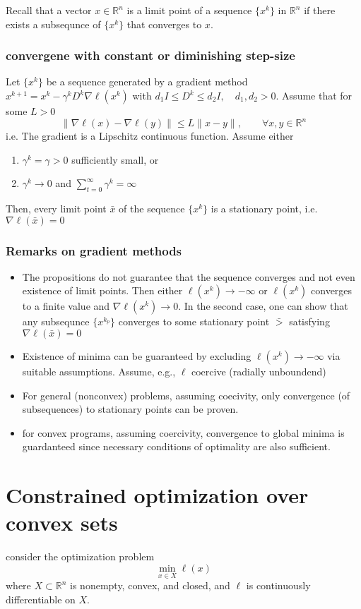\documentclass{book}
\newcommand{\R}{\mathbb{R}}
\begin{document}
Recall that a vector $x\in\R^n$ is a limit point of a sequence $\{x^k\}$ in $\R^n$ if there exists a subsequnce of $\{x^k\}$ that converges to $x$.

\subsubsection{convergene with constant or diminishing step-size}
Let $\{x^k\}$ be a sequence generated by a gradient method $x^{k+1}=x^k-\gamma^kD^k\nabla\ell(x^k)$ with $d_1I\leq D^k \leq d_2I, \quad d_1,d_2>0$. Assume that for some $L>0$ 
\[
    \|\nabla\ell(x)-\nabla\ell(y)\|\leq L\|x-y\|, \qquad \forall x,y\in\R^n
\]
i.e. The gradient is a Lipschitz continuous function.
Assume either
\begin{enumerate}
    \item $\gamma^k=\gamma>0$ sufficiently small, or 
    \item $\gamma^k\to 0$ and $\displaystyle\sum_{t=0}^{\infty}\gamma^k=\infty$
\end{enumerate}
Then, every limit point $\bar{x}$ of the sequence $\{x^k\}$ is a stationary point, i.e. $\nabla\ell(\bar{x})=0$

\subsubsection{Remarks on gradient methods}
\begin{itemize}
    \item The propositions do not guarantee that the sequence converges and not even existence of limit points. Then either $\ell(x^k)\to-\infty$ or $\ell(x^k)$ converges to a finite value and $\nabla\ell(x^k)\to 0$. In the second case, one can show that any subsequnce $\{x^{k_p}\}$ converges to some stationary point $\bar{>}$ satisfying $\nabla\ell(\bar{x})=0$
    \item Existence of minima can be guaranteed by excluding $\ell(x^k)\to-\infty$ via suitable assumptions. Assume, e.g., $\ell$ coercive (radially unboundend)
    \item For general (nonconvex) problems, assuming coecivity, only convergence (of subsequences) to stationary points can be proven.
    \item for convex programs, assuming coercivity, convergence to global minima is guardanteed since necessary conditions of optimality are also sufficient.
\end{itemize}

\section{Constrained optimization over convex sets}
consider the optimization problem 
\[
    \min_{x\in X}\ell(x)
\]
where $X \subset \R^n$ is nonempty, convex, and closed, and $\ell$ is continuously differentiable on $X$. 
\end{document}
